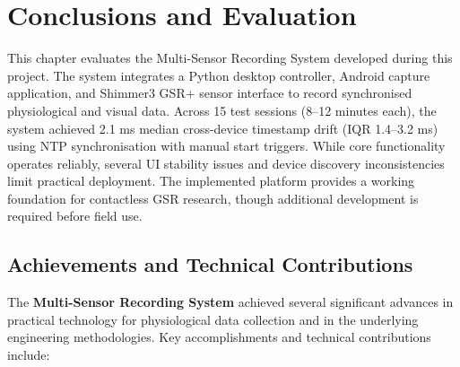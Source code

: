 \chapter{Conclusions and Evaluation}

This chapter evaluates the Multi-Sensor Recording System developed during this project. The system integrates a Python desktop controller, Android capture application, and Shimmer3 GSR+ sensor interface to record synchronised physiological and visual data. Across 15 test sessions (8--12 minutes each), the system achieved 2.1 ms median cross-device timestamp drift (IQR 1.4--3.2 ms) using NTP synchronisation with manual start triggers. While core functionality operates reliably, several UI stability issues and device discovery inconsistencies limit practical deployment. The implemented platform provides a working foundation for contactless GSR research, though additional development is required before field use.


\section{Achievements and Technical Contributions}

The \textbf{Multi-Sensor Recording System} achieved several significant advances in practical technology for physiological data collection and in the underlying engineering methodologies. Key accomplishments and technical contributions include:

